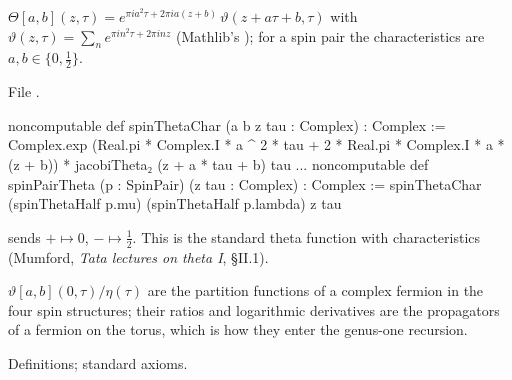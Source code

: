 \begin{definition}\label{l17:def:thetachar}
$\Theta[a,b](z,\tau)=e^{\pi ia^2\tau+2\pi ia(z+b)}\,\vartheta(z+a\tau+b,\tau)$ with
$\vartheta(z,\tau)=\sum_ne^{\pi in^2\tau+2\pi inz}$ (Mathlib's ); for a spin pair
the characteristics are $a,b\in\{0,\frac12\}$.
\end{definition}
\noindent File .
\begin{leancode}
noncomputable def spinThetaChar (a b z tau : Complex) : Complex :=
  Complex.exp (Real.pi * Complex.I * a ^ 2 * tau +
    2 * Real.pi * Complex.I * a * (z + b)) *
      jacobiTheta₂ (z + a * tau + b) tau
...
noncomputable def spinPairTheta (p : SpinPair) (z tau : Complex) : Complex :=
  spinThetaChar (spinThetaHalf p.mu) (spinThetaHalf p.lambda) z tau
\end{leancode}
\begin{dictionary}
 sends $+\mapsto0$, $-\mapsto\frac12$. This is the standard theta function with
characteristics (Mumford, \emph{Tata lectures on theta I}, §II.1).
\end{dictionary}
\begin{physics}
$\vartheta[a,b](0,\tau)/\eta(\tau)$ are the partition functions of a complex fermion in the four
spin structures; their ratios and logarithmic derivatives are the propagators of a fermion on the
torus, which is how they enter the genus-one recursion.
\end{physics}
\begin{status}
Definitions; standard axioms.
\end{status}

